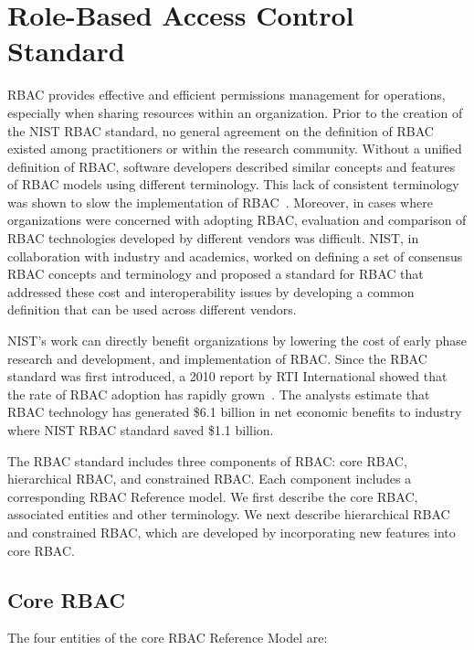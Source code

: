 \section{Role-Based Access Control Standard} \label{sec:core-rbac}

RBAC provides effective and efficient permissions management for operations, especially when sharing resources within an organization.
Prior to the creation of the NIST RBAC standard, no general agreement on the definition 
of RBAC existed among practitioners or within the research community. 
Without a unified definition of RBAC, software developers described similar concepts and features of RBAC models using different terminology. 
This lack of consistent terminology was shown to slow the implementation of RBAC~\cite{o20102010}.  
Moreover, in cases where organizations were concerned with adopting RBAC,
evaluation and comparison of RBAC technologies developed by different vendors was difficult.
NIST, in collaboration with industry and academics, worked on defining a set of consensus RBAC concepts and terminology and proposed a standard for 
RBAC that addressed these cost and interoperability issues by developing a common definition that can be used across different vendors.

NIST's work can directly benefit organizations by lowering the cost of early phase research and development, and implementation of RBAC.
Since the RBAC standard was first introduced, a 2010 report by RTI International showed that the rate of RBAC adoption has rapidly grown~\cite{o20102010}. 
The analysts estimate that RBAC technology has generated \$6.1 billion in net economic benefits to industry where NIST RBAC standard saved \$1.1 billion.

The RBAC standard includes three components of RBAC: core RBAC, hierarchical RBAC, and constrained RBAC. Each component includes a corresponding RBAC Reference model. We first describe the core RBAC, associated entities and other terminology. We next describe hierarchical RBAC and constrained RBAC, which are developed by incorporating new features into core RBAC. 

\subsection{Core RBAC} 

The four entities of the core RBAC Reference Model are:

